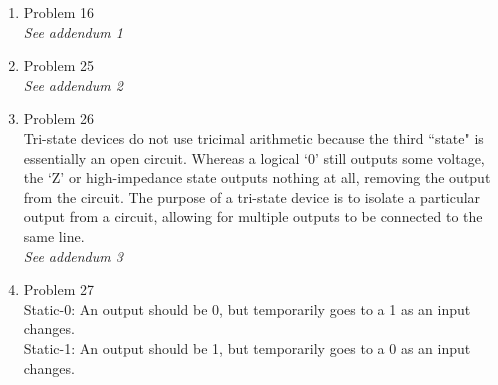 \begin{enumerate}[leftmargin=2cm,labelsep=.5cm,label=\bf\arabic*.]

\item Problem 16 \\
\emph{See addendum 1}

\item Problem 25 \\
\emph{See addendum 2}

\item Problem 26 \\
Tri-state devices do not use tricimal arithmetic because the third ``state" is essentially an open circuit. Whereas a logical `0' still outputs some voltage, the `Z' or high-impedance state outputs nothing at all, removing the output from the circuit. The purpose of a tri-state device is to isolate a particular output from a circuit, allowing for multiple outputs to be connected to the same line. \\
\emph{See addendum 3}

\item Problem 27 \\
Static-0: An output should be 0, but temporarily goes to a 1 as an input changes. \\
Static-1: An output should be 1, but temporarily goes to a 0 as an input changes.

\end{enumerate}
